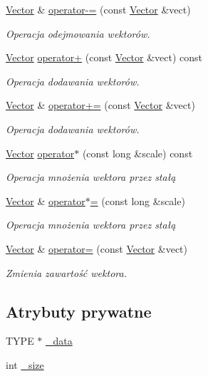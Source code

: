 \begin{DoxyCompactItemize}
\hyperlink{class_vector}{Vector} \& \hyperlink{class_vector_a8d2c68cdfbfe73ee0b0ed079cdb3c140}{operator-\/=} (const \hyperlink{class_vector}{Vector} \&vect)
\begin{DoxyCompactList}\small\item\em Operacja odejmowania wektorów. \end{DoxyCompactList}\item 
\hyperlink{class_vector}{Vector} \hyperlink{class_vector_a3c0a72f40f890076337794630efd273d}{operator+} (const \hyperlink{class_vector}{Vector} \&vect) const 
\begin{DoxyCompactList}\small\item\em Operacja dodawania wektorów. \end{DoxyCompactList}\item 
\hyperlink{class_vector}{Vector} \& \hyperlink{class_vector_aefe0eac24f57e27fa0ba334d863e0972}{operator+=} (const \hyperlink{class_vector}{Vector} \&vect)
\begin{DoxyCompactList}\small\item\em Operacja dodawania wektorów. \end{DoxyCompactList}\item 
\hyperlink{class_vector}{Vector} \hyperlink{class_vector_a3f16e888bbaca4d21674953f1ac4e7c6}{operator$\ast$} (const long \&scale) const 
\begin{DoxyCompactList}\small\item\em Operacja mnożenia wektora przez stałą \end{DoxyCompactList}\item 
\hyperlink{class_vector}{Vector} \& \hyperlink{class_vector_a0165370ffd16bec25040201b7cd646e6}{operator$\ast$=} (const long \&scale)
\begin{DoxyCompactList}\small\item\em Operacja mnożenia wektora przez stałą \end{DoxyCompactList}\item 
\hyperlink{class_vector}{Vector} \& \hyperlink{class_vector_ae0e577a62222292e5299b8571ef5bcce}{operator=} (const \hyperlink{class_vector}{Vector} \&vect)
\begin{DoxyCompactList}\small\item\em Zmienia zawartość wektora. \end{DoxyCompactList}\end{DoxyCompactItemize}
\subsection*{Atrybuty prywatne}
\begin{DoxyCompactItemize}
\item 
T\-Y\-P\-E $\ast$ \hyperlink{class_vector_a7423601b523502c849ad51317178c4d0}{\-\_\-data}
\item 
int \hyperlink{class_vector_a327a1cd9125262e7023b39ff6bc2a6c0}{\-\_\-size}
\end{DoxyCompactItemize}

